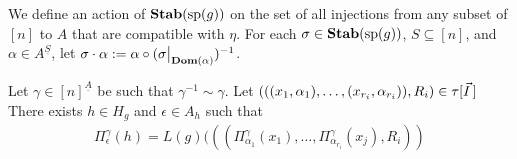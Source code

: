 \documentclass[../main/thesis.tex]{subfiles}
\begin{document}
We define an action of $\text{\textbf{Stab}} (\text{sp} (g))$ on the set of all injections from any subset
of $[n]$ to $A$ that are compatible with $\eta$. For each $\sigma \in
\text{\textbf{Stab}} (\text{sp} (g))$, $S \subseteq [n]$, and $\alpha \in A^{\underline{S}}$, let $\sigma
\cdot \alpha := \alpha \circ (\restr{\sigma}{\dom(\alpha)})^{-1}$.
\begin{lem}
  Let $\gamma \in [n]^{\underline{A}}$ be such that $\gamma^{-1} \sim \gamma$.
  Let $(((x_1, \alpha_1), \ldots, (x_{r_i}, \alpha_{r_i})), R_i) \in
  \tau[\vec{I}\,]$ There exists $h \in H_g$ and $\epsilon \in A_h$ such
  that \vspace{-1.5mm}
  \begin{align*}
    \Pi^{\gamma}_{\epsilon} (h) = L(g)(((\Pi^{\gamma}_{\alpha_1} (x_1), \ldots,
    \Pi^{\gamma}_{\alpha_{r_i}}(x_j), R_i))
  \end{align*}
  \label{lem:defining-h-from-index}
\end{lem}
\end{document}
